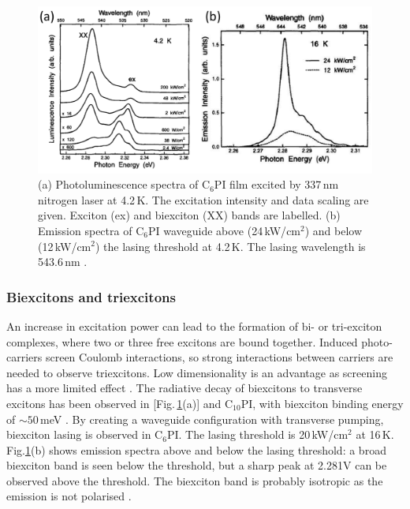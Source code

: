 \begin{figure}[h!]
\centering
\includegraphics[width=\textwidth]{Fig15}
\caption{(a) Photoluminescence spectra of $\textrm{C}_{6}$PI film excited by 337\,nm nitrogen laser at 4.2\,K. The excitation intensity and data scaling are given. Exciton (ex) and biexciton (XX) bands are labelled. (b) Emission spectra of $\textrm{C}_{6}$PI waveguide above (24\,kW/$\textrm{cm}^2$) and below (12\,kW/$\textrm{cm}^2$) the lasing threshold at 4.2\,K. The lasing wavelength is 543.6\,nm \cite{Kondo1998}.}
\label{2Fig15}
\end{figure}
\subsubsection{Biexcitons and triexcitons}
An increase in excitation power can lead to the formation of bi- or tri-exciton complexes, where two or three free excitons are bound together. Induced photo-carriers screen Coulomb interactions, so strong interactions between carriers are needed to observe triexcitons. Low dimensionality is an advantage as screening has a more limited effect \cite{Shimizu2006a}. The radiative decay of biexcitons to transverse excitons has been observed in  [Fig.\,\ref{2Fig15}(a)] and $\textrm{C}_{10}$PI, with biexciton binding energy of $\sim50$\,meV \cite{Kondo1998, Ishihara1992}. By creating a waveguide configuration with transverse pumping, biexciton lasing is observed in $\textrm{C}_6$PI. The lasing threshold is 20\,kW/$\textrm{cm}^2$ at 16\,K. Fig.\ref{2Fig15}(b) shows emission spectra above and below the lasing threshold: a broad biexciton band is seen below the threshold, but a sharp peak at 2.281V can be observed above the threshold. The biexciton band is probably isotropic as the emission is not polarised \cite{Kondo1998}.

